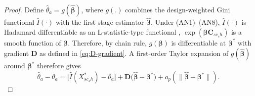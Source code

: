 \documentclass[12pt]{article}
\theoremstyle{plain}
\theoremstyle{definition}
\begin{document}
\begin{proof}
Define $\hat\theta_a = g(\hat{\boldsymbol\beta})$, where $g(.)$ combines the design-weighted Gini functional $\hat I(\cdot)$ with the first-stage estimator $\hat{\boldsymbol \beta}$. Under (AN1)--(AN8),  $\hat I(\cdot)$ is Hadamard differentiable as an L-statistic-type functional \citep{Fernholz1983}, $\exp(\boldsymbol\beta\mathbf C_{sc_sh})$ is a smooth function of $\boldsymbol\beta$. Therefore, by chain rule, $g({\boldsymbol\beta})$ is differentiable at $\boldsymbol\beta^*$ with gradient $\mathbf D$ as defined in \eqref{eq:D-gradient}. A first-order Taylor expansion of $g(\hat{\boldsymbol\beta})$
around $\boldsymbol\beta^*$ therefore gives
\begin{equation}
\hat\theta_a-\theta_a
= \Big[\hat I(X^*_{sc_sh})-\theta_a\Big]
+ \mathbf D\Big(\hat{\boldsymbol\beta}-\boldsymbol\beta^*\Big)
+ o_p\!\left(\big\|\hat{\boldsymbol\beta}-\boldsymbol\beta^*\big\|\right).
\label{eq:proof-expansion-a}
\end{equation}


\end{proof}
\end{document}
